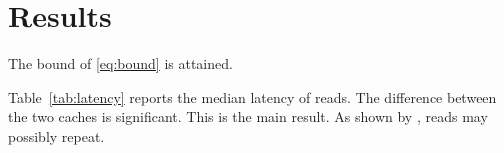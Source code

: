 \section{Results}\label{sec:results}

\begin{theorem}\label{thm:tight}
The bound of \cref{eq:bound} is attained.
\end{theorem}

Table~\ref{tab:latency} reports the median latency of reads.
The difference between the two caches is significant.
This is the main result.
As shown by \citet{smith2021}, reads may possibly repeat.
